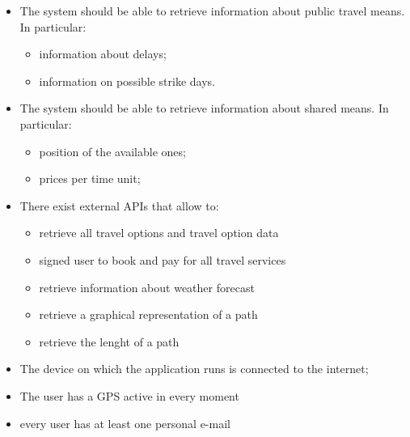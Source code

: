 \begin{itemize}

\item The system should be able to retrieve information about public travel means. In particular:
\begin{itemize}
\item information about delays;
\item information on possible strike days.
\end{itemize}

\item The system should be able to retrieve information about shared means. In particular:
\begin{itemize}
\item position of the available ones;
\item prices per time unit;
\end{itemize}

\item There exist external APIs that allow to:
\begin{itemize}
\item retrieve all travel options and travel option data
\item signed user to book and pay for all travel services
\item retrieve information about weather forecast
\item retrieve a graphical representation of a path
\item retrieve the lenght of a path
\end{itemize}

\item The device on which the application runs is connected to the internet;

\item The user has a GPS active in every moment

\item every user has at least one personal e-mail 

\end{itemize}





